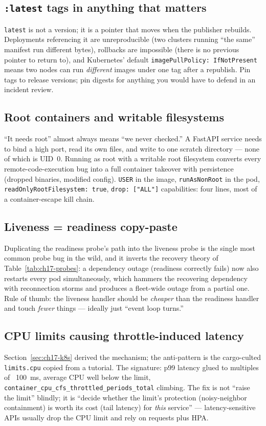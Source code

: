 \subsection*{\texttt{:latest} tags in anything that matters}
\texttt{latest} is not a version; it is a pointer that moves when the
publisher rebuilds. Deployments referencing it are unreproducible (two
clusters running ``the same'' manifest run different bytes), rollbacks
are impossible (there is no previous pointer to return to), and
Kubernetes' default \texttt{imagePullPolicy: IfNotPresent} means two
nodes can run \emph{different} images under one tag after a republish.
Pin tags to release versions; pin digests for anything you would have to
defend in an incident review.

\subsection*{Root containers and writable filesystems}
``It needs root'' almost always means ``we never checked.'' A FastAPI
service needs to bind a high port, read its own files, and write to one
scratch directory --- none of which is UID~0. Running as root with a
writable root filesystem converts every remote-code-execution bug into a
full container takeover with persistence (dropped binaries, modified
config). \texttt{USER} in the image, \texttt{runAsNonRoot} in the pod,
\texttt{readOnlyRootFilesystem: true}, \texttt{drop: ["ALL"]}
capabilities: four lines, most of a container-escape kill chain.

\subsection*{Liveness = readiness copy-paste}
Duplicating the readiness probe's path into the liveness probe is the
single most common probe bug in the wild, and it inverts the recovery
theory of Table~\ref{tab:ch17-probes}: a dependency outage (readiness
correctly fails) now also restarts every pod simultaneously, which
hammers the recovering dependency with reconnection storms and produces
a fleet-wide outage from a partial one. Rule of thumb: the liveness
handler should be \emph{cheaper} than the readiness handler and touch
\emph{fewer} things --- ideally just ``event loop turns.''

\subsection*{CPU limits causing throttle-induced latency}
Section~\ref{sec:ch17-k8s} derived the mechanism; the anti-pattern is the
cargo-culted \texttt{limits.cpu} copied from a tutorial. The signature:
p99 latency glued to multiples of ~100~ms, average CPU well below the
limit, \texttt{container\_cpu\_cfs\_throttled\_periods\_total} climbing.
The fix is not ``raise the limit'' blindly; it is ``decide whether the
limit's protection (noisy-neighbor containment) is worth its cost (tail
latency) for \emph{this} service'' --- latency-sensitive APIs usually
drop the CPU limit and rely on requests plus HPA.

